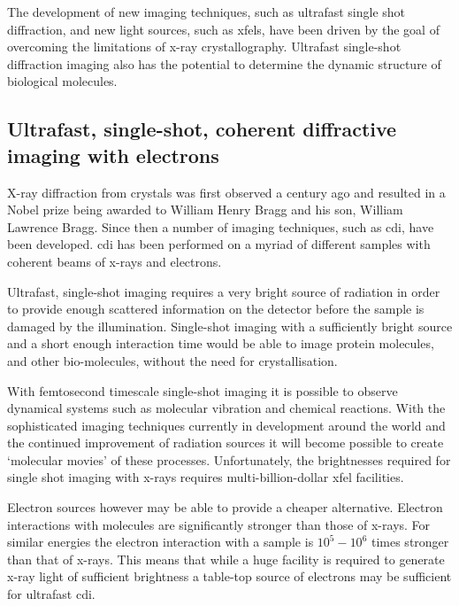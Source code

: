 The development of new imaging techniques, such as ultrafast single shot diffraction, and new light sources, such as \glspl{xfel}, have been driven by the goal of overcoming the limitations of x-ray crystallography. Ultrafast single-shot diffraction imaging also has the potential to determine the dynamic structure of biological molecules.


\subsection{Ultrafast, single-shot, coherent diffractive imaging with electrons}

X-ray diffraction from crystals was first observed a century ago\cite{bragg_x-rays_1912} and resulted in a Nobel prize being awarded to William Henry Bragg and his son, William Lawrence Bragg. Since then a number of imaging techniques, such as \gls{cdi}, have been developed. \Gls{cdi} has been performed on a myriad of different samples with coherent beams of x-rays and electrons.

Ultrafast, single-shot imaging requires a very bright source of radiation in order to provide enough scattered information on the detector before the sample is damaged by the illumination\cite{henderson_potential_1995}. Single-shot imaging with a sufficiently bright source and a short enough interaction time would be able to image protein molecules, and other bio-molecules, without the need for crystallisation\cite{neutze_potential_2000}.

With femtosecond timescale single-shot imaging it is possible to observe dynamical systems such as molecular vibration and chemical reactions\cite{zewail_4d_2006}. With the sophisticated imaging techniques currently in development around the world and the continued improvement of radiation sources it will become possible to create `molecular movies'\cite{dwyer_femtosecond_2006} of these processes. Unfortunately, the brightnesses required for single shot imaging with x-rays requires multi-billion-dollar \gls{xfel} facilities.

Electron sources however may be able to provide a cheaper alternative. Electron interactions with molecules are significantly stronger than those of x-rays. For similar energies the electron interaction with a sample is $10^5-10^6$ times stronger than that of x-rays\cite{sciaini_femtosecond_2011}. This means that while a huge facility is required to generate x-ray light of sufficient brightness a table-top source of electrons may be sufficient for ultrafast \gls{cdi}.

